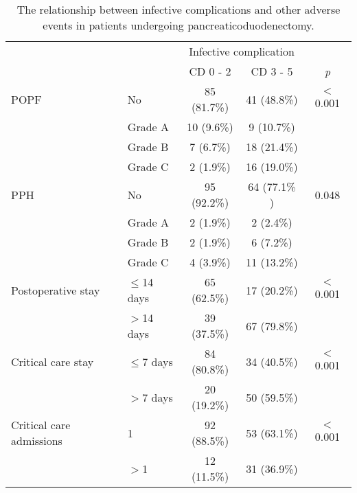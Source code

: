 \begin{table}[p]
	\centering
	\caption{The relationship between infective complications and other adverse events in patients undergoing pancreaticoduodenectomy.}
	\label{table:crp_comp_infect_vs_other_complications}
	\renewcommand{\arraystretch}{1.5} %
	\setlength{\tabcolsep}{9pt} %
	\begin{tabular}{|l l c c c|}
		\hline
		                         &               & \multicolumn{2}{c}{Infective complication} &  \\
		                         &               & CD 0 - 2     & CD 3 - 5                    & \textit{p} \\ \hline
		POPF                     & No            & 85 (81.7\%)  & 41 (48.8\%)                 & $<$0.001   \\
		                         & Grade A       & 10 (9.6\%)   & 9 (10.7\%)                  &  \\
		                         & Grade B       & 7 (6.7\%)    & 18 (21.4\%)                 &  \\
		                         & Grade C       & 2 (1.9\%)    & 16 (19.0\%)                 &  \\
		PPH                      & No            & 95 (92.2\%)  & 64 (77.1\% )                & 0.048      \\
		                         & Grade A       & 2 (1.9\%)    & 2 (2.4\%)                   &  \\
		                         & Grade B       & 2 (1.9\%)    & 6 (7.2\%)                   &  \\
		                         & Grade C       & 4  (3.9\%)   & 11 (13.2\%)                 &  \\
		Postoperative stay       & $\leq$14 days & 65 (62.5\%)  & 17 (20.2\%)                 & $<$0.001   \\
		                         & $>$14 days    & 39 (37.5\%)  & 67 (79.8\%)                 &  \\
		Critical care stay       & $\leq$7 days  & 84 (80.8\%)  & 34 (40.5\%)                 & $<$0.001   \\
		                         & $>$7 days     & 20 (19.2\%)  & 50 (59.5\%)                 &  \\
		Critical care admissions & 1             & 92 (88.5\%)  & 53 (63.1\%)                 & $<$0.001   \\
		                         & $>$1          & 12 (11.5\%)  & 31 (36.9\%)                 &  \\

\end{tabular}
\end{table}
